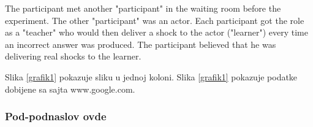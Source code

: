 \documentclass[conference]{IEEEtran}
\begin{document}
The participant met another "participant" in the waiting room before the experiment. 
The other "participant" was an actor. Each participant got the role as a "teacher" who 
would then deliver a shock to the actor ("learner") every time an incorrect answer was 
produced. \cite{travers1969experimental} The participant believed that he was delivering real 
shocks to the learner.

Slika \ref{grafik1} pokazuje sliku u jednoj koloni. Slika \ref{grafik1} pokazuje podatke dobijene sa sajta www.google.com. \cite{google}

\lipsum[1-1]

\subsubsection{Pod-podnaslov ovde}
\lipsum[1-6] 
\end{document}
